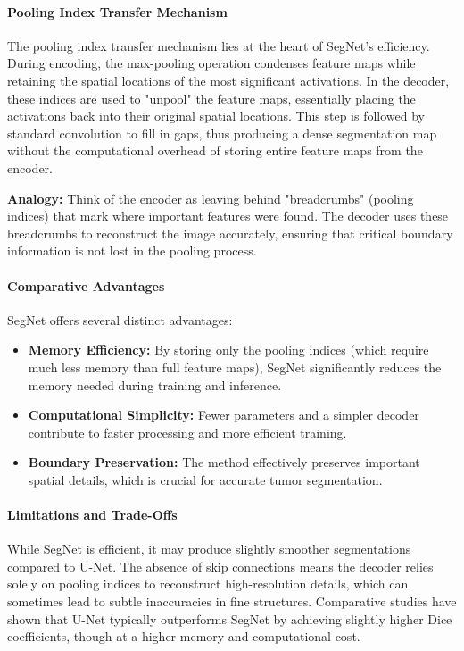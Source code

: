 \paragraph{Pooling Index Transfer Mechanism}
\label{sec:pooling_indices}
The pooling index transfer mechanism lies at the heart of SegNet's efficiency. During encoding, the max-pooling operation condenses feature maps while retaining the spatial locations of the most significant activations. In the decoder, these indices are used to "unpool" the feature maps, essentially placing the activations back into their original spatial locations. This step is followed by standard convolution to fill in gaps, thus producing a dense segmentation map without the computational overhead of storing entire feature maps from the encoder.

\textbf{Analogy:} Think of the encoder as leaving behind "breadcrumbs" (pooling indices) that mark where important features were found. The decoder uses these breadcrumbs to reconstruct the image accurately, ensuring that critical boundary information is not lost in the pooling process.

\paragraph{Comparative Advantages}
\label{sec:segnet_advantages}
SegNet offers several distinct advantages:
\begin{itemize}
    \item \textbf{Memory Efficiency:} By storing only the pooling indices (which require much less memory than full feature maps), SegNet significantly reduces the memory needed during training and inference.
    \item \textbf{Computational Simplicity:} Fewer parameters and a simpler decoder contribute to faster processing and more efficient training.
    \item \textbf{Boundary Preservation:} The method effectively preserves important spatial details, which is crucial for accurate tumor segmentation.
\end{itemize}

\paragraph{Limitations and Trade-Offs}
\label{sec:segnet_limitations}
While SegNet is efficient, it may produce slightly smoother segmentations compared to U-Net. The absence of skip connections means the decoder relies solely on pooling indices to reconstruct high-resolution details, which can sometimes lead to subtle inaccuracies in fine structures. Comparative studies \cite{kasar2024comparative,vedhasri2024segmentation} have shown that U-Net typically outperforms SegNet by achieving slightly higher Dice coefficients, though at a higher memory and computational cost.

